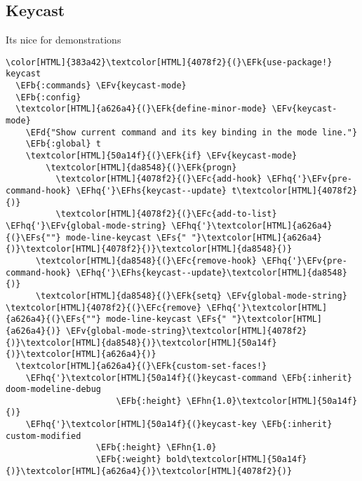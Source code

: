 \documentclass{scrartcl}
\newcommand{\EFk}[1]{\textcolor{EFk}{#1}} %
\newcommand{\EFd}[1]{\textcolor{EFd}{\textit{#1}}} %
\newcommand{\EFs}[1]{\textcolor{EFs}{#1}} %
\newcommand{\EFb}[1]{\textcolor{EFb}{#1}} %
\newcommand{\EFc}[1]{\textcolor{EFc}{#1}} %
\newcommand{\EFv}[1]{\textcolor{EFv}{#1}} %
\newcommand{\EFhn}[1]{\textcolor{EFhn}{\textbf{#1}}} %
\newcommand{\EFhq}[1]{\textcolor{EFhq}{#1}} %
\newcommand{\EFhs}[1]{\textcolor{EFhs}{#1}} %
\begin{document}
\subsection{Keycast}
\label{sec:org150d589}
Its nice for demonstrations
\begin{Code}
\begin{Verbatim}[]
\color[HTML]{383a42}\textcolor[HTML]{4078f2}{(}\EFk{use-package!} keycast
  \EFb{:commands} \EFv{keycast-mode}
  \EFb{:config}
  \textcolor[HTML]{a626a4}{(}\EFk{define-minor-mode} \EFv{keycast-mode}
    \EFd{"Show current command and its key binding in the mode line."}
    \EFb{:global} t
    \textcolor[HTML]{50a14f}{(}\EFk{if} \EFv{keycast-mode}
        \textcolor[HTML]{da8548}{(}\EFk{progn}
          \textcolor[HTML]{4078f2}{(}\EFc{add-hook} \EFhq{'}\EFv{pre-command-hook} \EFhq{'}\EFhs{keycast--update} t\textcolor[HTML]{4078f2}{)}
          \textcolor[HTML]{4078f2}{(}\EFc{add-to-list} \EFhq{'}\EFv{global-mode-string} \EFhq{'}\textcolor[HTML]{a626a4}{(}\EFs{""} mode-line-keycast \EFs{" "}\textcolor[HTML]{a626a4}{)}\textcolor[HTML]{4078f2}{)}\textcolor[HTML]{da8548}{)}
      \textcolor[HTML]{da8548}{(}\EFc{remove-hook} \EFhq{'}\EFv{pre-command-hook} \EFhq{'}\EFhs{keycast--update}\textcolor[HTML]{da8548}{)}
      \textcolor[HTML]{da8548}{(}\EFk{setq} \EFv{global-mode-string} \textcolor[HTML]{4078f2}{(}\EFc{remove} \EFhq{'}\textcolor[HTML]{a626a4}{(}\EFs{""} mode-line-keycast \EFs{" "}\textcolor[HTML]{a626a4}{)} \EFv{global-mode-string}\textcolor[HTML]{4078f2}{)}\textcolor[HTML]{da8548}{)}\textcolor[HTML]{50a14f}{)}\textcolor[HTML]{a626a4}{)}
  \textcolor[HTML]{a626a4}{(}\EFk{custom-set-faces!}
    \EFhq{'}\textcolor[HTML]{50a14f}{(}keycast-command \EFb{:inherit} doom-modeline-debug
                      \EFb{:height} \EFhn{1.0}\textcolor[HTML]{50a14f}{)}
    \EFhq{'}\textcolor[HTML]{50a14f}{(}keycast-key \EFb{:inherit} custom-modified
                  \EFb{:height} \EFhn{1.0}
                  \EFb{:weight} bold\textcolor[HTML]{50a14f}{)}\textcolor[HTML]{a626a4}{)}\textcolor[HTML]{4078f2}{)}
\end{Verbatim}
\end{Code}
\end{document}
